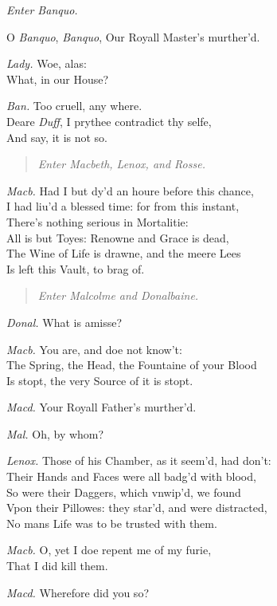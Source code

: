 \documentclass[12pt]{sides}
\newcommand{\StageDir}[1]{\begin{quote}\centering\em #1\end{quote}}
\newcommand{\clStageDir}[1]{\hspace*{\fill}\textit{#1}\hspace*{\fill}}
\newcommand{\dia}[1]{\hskip 15pt\textit{#1}\hskip 6pt}
\begin{document}
\begin{multicols}{2}
            \clStageDir{Enter Banquo.}

            O \textit{Banquo}, \textit{Banquo}, Our Royall Master's murther'd.

            \dia{Lady.} Woe, alas: \\ What, in our House?

            \dia{Ban.} Too cruell, any where. \\ Deare \textit{Duff}, I prythee contradict thy selfe, \\ And say, it is not so.

            \StageDir{Enter Macbeth, Lenox, and Rosse.}

            \dia{Macb.} Had I but dy'd an houre before this chance, \\ I had liu'd a blessed time: for from this instant, \\ There's nothing serious in Mortalitie: \\ All is but Toyes: Renowne and Grace is dead, \\ The Wine of Life is drawne, and the meere Lees \\ Is left this Vault, to brag of.

            \StageDir{Enter Malcolme and Donalbaine.}

            \dia{Donal.} What is amisse?

            \dia{Macb.} You are, and doe not know't: \\ The Spring, the Head, the Fountaine of your Blood \\ Is stopt, the very Source of it is stopt.

            \dia{Macd.} Your Royall Father's murther'd.

            \dia{Mal.} Oh, by whom?

            \dia{Lenox.} Those of his Chamber, as it seem'd, had don't: \\ Their Hands and Faces were all badg'd with blood, \\ So were their Daggers, which vnwip'd, we found \\ Vpon their Pillowes: they star'd, and were distracted, \\ No mans Life was to be trusted with them.

            \dia{Macb.} O, yet I doe repent me of my furie, \\ That I did kill them.

            \dia{Macd.} Wherefore did you so?


\end{multicols}
\end{document}
